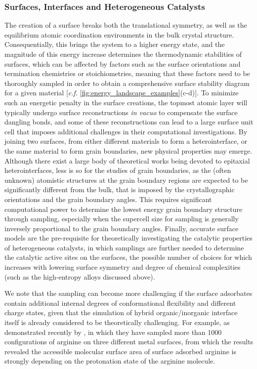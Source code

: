 \subsubsection{Surfaces, Interfaces and Heterogeneous Catalysts} The creation of a surface breaks both the translational symmetry, as well as the equilibrium atomic coordination environments in the bulk crystal structure. Consequentially, this brings the system to a higher energy state, and the magnitude of this energy increase determines the thermodynamic stabilities of surfaces, which can be affected by factors such as the surface orientations and termination chemistries or stoichiometries, meaning that these factors need to be thoroughly sampled in order to obtain a comprehensive surface stability diagram for a given material [\emph{c.f.} \cref{fig:energy_landscape_examples}(c-d)]. To minimize such an energetic penalty in the surface creations, the topmost atomic layer will typically undergo surface reconstructions \emph{in vacuo} to compensate the surface dangling bonds, and some of these reconstructions can lead to a large surface unit cell\cite{kruger2006generalized,battaglia2009structure} that imposes additional challenges in their computational investigations. By joining two surfaces, from either different materials to form a heterointerface, or the same material to form grain boundaries, new physical properties may emerge. Although there exist a large body of theoretical works being devoted to  epitaxial heterointerfaces, less is so for the studies of grain boundaries, as the (often unknown) atomistic structures at the grain boundary regions are expected to be significantly different from the bulk, that is imposed by the crystallographic orientations and the grain boundary angles.\cite{chua2010genetic} This requires significant computational power to determine the lowest energy grain boundary structure through sampling, especially when the supercell size for sampling is generally inversely proportional to the grain boundary angles. Finally, accurate surface models are the pre-requisite for theoretically  investigating the  catalytic properties of heterogeneous catalysts, in which samplings are further needed to determine the catalytic active sites on the surfaces, the possible number of choices for which increases with lowering surface symmetry and degree of chemical complexities (such as the high-entropy alloys discussed above). 



We note that the sampling can become more challenging if the surface adsorbates contain additional internal degrees of conformational flexibility and different charge states, given that the simulation of hybrid organic/inorganic interface itself is already considered to be theoretically challenging.\cite{draxl2014organic} For example, as demonstrated recently by \citet{maksimov2021conformational}, in which they have sampled more than 1000 configurations of arginine on three different metal surfaces, from which the results revealed the accessible molecular surface area of surface adsorbed arginine is strongly depending on the protonation state of the arginine molecule. 

